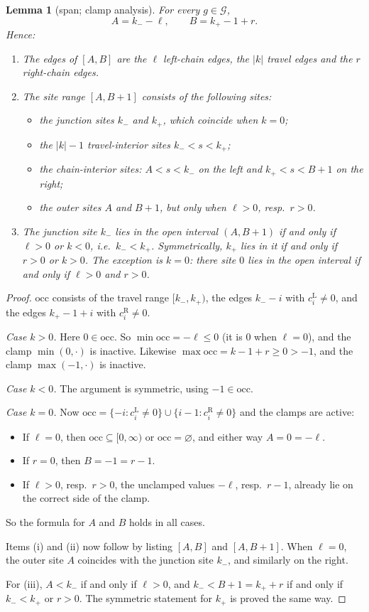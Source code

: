 \documentclass[11pt]{article}
\theoremstyle{plain}
\newtheorem{lemma}[theorem]{Lemma}
\theoremstyle{definition}
\theoremstyle{remark}
\begin{document}
\begin{lemma}[span; clamp analysis]\label{M3:lem:span}
For every $g\in\mathcal G$,
\[
  A=k_--\ell,\qquad B=k_+-1+r .
\]
Hence:
\begin{enumerate}
\item[(i)] The edges of $[A,B]$ are the $\ell$ left-chain edges, the $|k|$ travel edges and
  the $r$ right-chain edges.
\item[(ii)] The site range $[A,B+1]$ consists of the following sites:
  \begin{itemize}
  \item the \emph{junction sites} $k_-$ and $k_+$, which coincide when $k=0$;
  \item the $|k|-1$ \emph{travel-interior} sites $k_-<s<k_+$;
  \item the \emph{chain-interior} sites: $A<s<k_-$ on the left and $k_+<s<B+1$ on the right;
  \item the \emph{outer sites} $A$ and $B+1$, but only when $\ell>0$, resp.\ $r>0$.
  \end{itemize}
\item[(iii)] The junction site $k_-$ lies in the open interval $(A,B+1)$ if and only if
  $\ell>0$ or $k<0$, i.e.\ $k_-<k_+$. Symmetrically, $k_+$ lies in it if and only if $r>0$
  or $k>0$. The exception is $k=0$: there site $0$ lies in the open interval if and only if
  $\ell>0$ \emph{and} $r>0$.
\end{enumerate}
\end{lemma}

\begin{proof}
$\mathrm{occ}$ consists of the travel range $[k_-,k_+)$, the edges $k_--i$ with
$c^{\mathrm L}_i\ne0$, and the edges $k_+-1+i$ with $c^{\mathrm R}_i\ne0$.

\emph{Case $k>0$.} Here $0\in\mathrm{occ}$. So $\min\mathrm{occ}=-\ell\le0$ (it is $0$ when
$\ell=0$), and the clamp $\min(0,\cdot)$ is inactive. Likewise
$\max\mathrm{occ}=k-1+r\ge0>-1$, and the clamp $\max(-1,\cdot)$ is inactive.

\emph{Case $k<0$.} The argument is symmetric, using $-1\in\mathrm{occ}$.

\emph{Case $k=0$.} Now $\mathrm{occ}=\{-i:c^{\mathrm L}_i\ne0\}\cup\{i-1:c^{\mathrm R}_i\ne0\}$
and the clamps are active:
\begin{itemize}
\item If $\ell=0$, then $\mathrm{occ}\subseteq[0,\infty)$ or $\mathrm{occ}=\varnothing$, and
  either way $A=0=-\ell$.
\item If $r=0$, then $B=-1=r-1$.
\item If $\ell>0$, resp.\ $r>0$, the unclamped values $-\ell$, resp.\ $r-1$, already lie on
  the correct side of the clamp.
\end{itemize}
So the formula for $A$ and $B$ holds in all cases.

Items (i) and (ii) now follow by listing $[A,B]$ and $[A,B+1]$. When $\ell=0$, the outer site
$A$ coincides with the junction site $k_-$, and similarly on the right.

For (iii), $A<k_-$ if and only if $\ell>0$, and $k_-<B+1=k_++r$ if and only if $k_-<k_+$ or
$r>0$. The symmetric statement for $k_+$ is proved the same way.
\end{proof}
\end{document}
